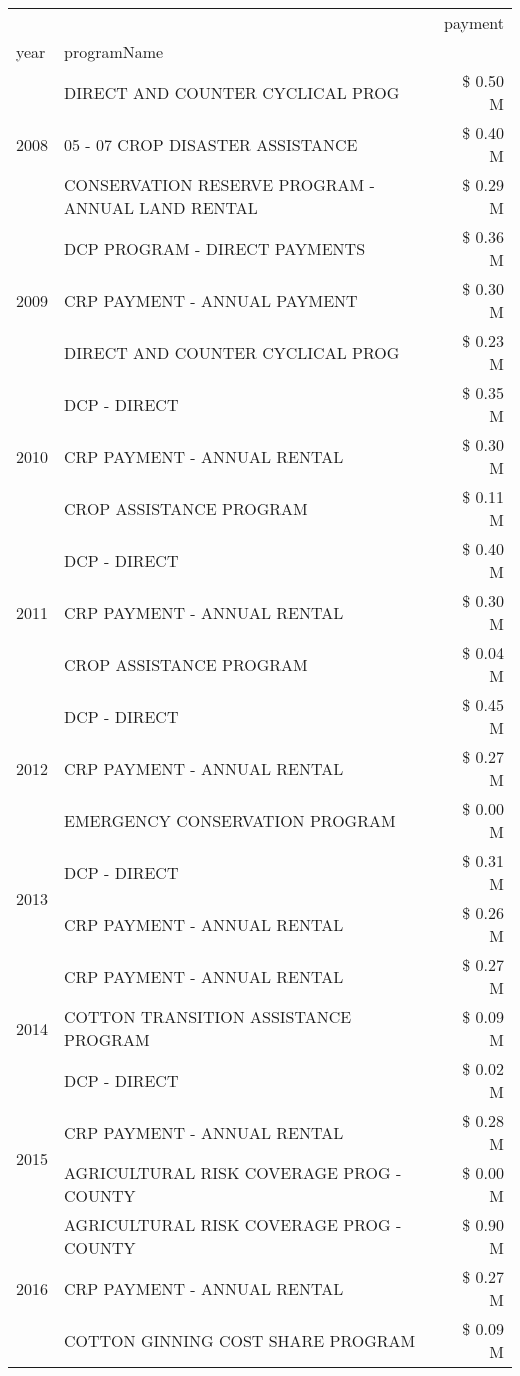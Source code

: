 \begin{tabular}{llr}
\toprule
 &  & payment \\
year & programName &  \\
\midrule
\multirow[t]{3}{*}{2008} & DIRECT AND COUNTER CYCLICAL PROG & \$ 0.50 M \\
 & 05 - 07 CROP DISASTER ASSISTANCE & \$ 0.40 M \\
 & CONSERVATION RESERVE PROGRAM - ANNUAL LAND RENTAL & \$ 0.29 M \\
\cline{1-3}
\multirow[t]{3}{*}{2009} & DCP PROGRAM - DIRECT PAYMENTS & \$ 0.36 M \\
 & CRP PAYMENT - ANNUAL PAYMENT & \$ 0.30 M \\
 & DIRECT AND COUNTER CYCLICAL PROG & \$ 0.23 M \\
\cline{1-3}
\multirow[t]{3}{*}{2010} & DCP - DIRECT & \$ 0.35 M \\
 & CRP PAYMENT - ANNUAL RENTAL & \$ 0.30 M \\
 & CROP ASSISTANCE PROGRAM & \$ 0.11 M \\
\cline{1-3}
\multirow[t]{3}{*}{2011} & DCP - DIRECT & \$ 0.40 M \\
 & CRP PAYMENT - ANNUAL RENTAL & \$ 0.30 M \\
 & CROP ASSISTANCE PROGRAM & \$ 0.04 M \\
\cline{1-3}
\multirow[t]{3}{*}{2012} & DCP - DIRECT & \$ 0.45 M \\
 & CRP PAYMENT - ANNUAL RENTAL & \$ 0.27 M \\
 & EMERGENCY CONSERVATION PROGRAM & \$ 0.00 M \\
\cline{1-3}
\multirow[t]{2}{*}{2013} & DCP - DIRECT & \$ 0.31 M \\
 & CRP PAYMENT - ANNUAL RENTAL & \$ 0.26 M \\
\cline{1-3}
\multirow[t]{3}{*}{2014} & CRP PAYMENT - ANNUAL RENTAL & \$ 0.27 M \\
 & COTTON TRANSITION ASSISTANCE PROGRAM & \$ 0.09 M \\
 & DCP - DIRECT & \$ 0.02 M \\
\cline{1-3}
\multirow[t]{2}{*}{2015} & CRP PAYMENT - ANNUAL RENTAL & \$ 0.28 M \\
 & AGRICULTURAL RISK COVERAGE PROG - COUNTY & \$ 0.00 M \\
\cline{1-3}
\multirow[t]{3}{*}{2016} & AGRICULTURAL RISK COVERAGE PROG - COUNTY & \$ 0.90 M \\
 & CRP PAYMENT - ANNUAL RENTAL & \$ 0.27 M \\
 & COTTON GINNING COST SHARE PROGRAM & \$ 0.09 M \\

\end{tabular}
